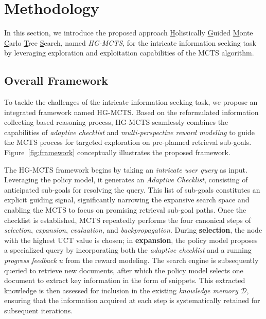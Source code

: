 \section{Methodology}

In this section, we introduce the proposed approach \underline{H}olistically \underline{G}uided \underline{M}onte \underline{C}arlo \underline{T}ree \underline{S}earch, named \emph{HG-MCTS}, for the intricate information seeking task by leveraging exploration and exploitation capabilities of the MCTS algorithm.


\subsection{Overall Framework}

To tackle the challenges of the intricate information seeking task, we propose an integrated framework named HG-MCTS. Based on the reformulated information collecting based reasoning process, HG-MCTS seamlessly combines the capabilities of \emph{adaptive checklist} and \emph{multi-perspective reward modeling} to guide the MCTS process for targeted exploration on pre-planned retrieval sub-goals. Figure~\ref{fig:framework} conceptually illustrates the proposed framework.

The HG-MCTS framework begins by taking an \emph{intricate user query} as input. Leveraging the policy model, it generates an \emph{Adaptive Checklist}, consisting of anticipated sub-goals for resolving the query. This list of sub-goals constitutes an explicit guiding signal, significantly narrowing the expansive search space and enabling the MCTS to focus on promising retrieval sub-goal paths. Once the checklist is established, MCTS repeatedly performs the four canonical steps of \emph{selection}, \emph{expansion}, \emph{evaluation}, and \emph{backpropagation}. During \textbf{selection}, the node with the highest UCT value is chosen; in \textbf{expansion}, the policy model proposes a specialized query by incorporating both the \emph{adaptive checklist} and a running \emph{progress feedback} $u$ from the reward modeling. 
The search engine is subsequently queried to retrieve new documents, after which the policy model selects one document to extract key information in the form of snippets. This extracted knowledge is then assessed for inclusion in the existing \emph{knowledge memory} $\mathcal{D}$, ensuring that the information acquired at each step is systematically retained for subsequent iterations.

